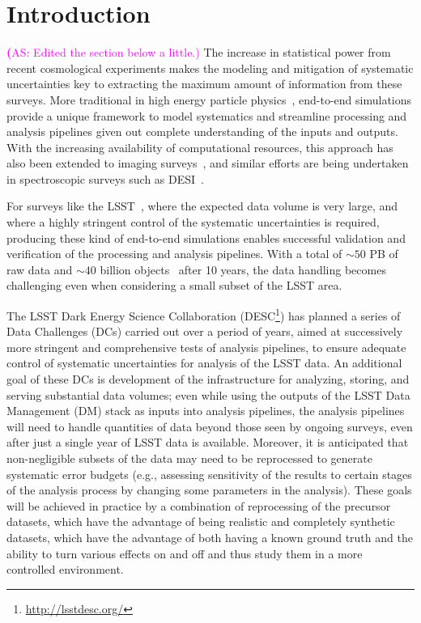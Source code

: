 \documentclass[twocolumn]{aastex62}
\newcommand{\as}[1]{{\textcolor{magenta}{{\textbf (AS: #1)}}}}
\begin{document}

\section{Introduction}
\label{sec:intro}
\as{Edited the section below a little.}
The increase in statistical power from recent cosmological experiments makes the modeling and mitigation of systematic uncertainties key to extracting the maximum amount of information from these surveys. More traditional in high energy particle physics~\citep{Brun:118715, 2006JHEP...05..026S}, end-to-end simulations provide a unique framework to
model systematics and streamline processing and analysis pipelines given out complete understanding of the inputs and outputs. With the increasing availability of computational resources, this approach has also been extended to imaging surveys~\citep{2016ApJ...817...25B}, and similar efforts are being undertaken in spectroscopic surveys such as DESI~\citep{2016arXiv161100036D}.

For surveys like the LSST~\citep{Overview}, where the expected data volume is very large, and where a highly stringent control of the systematic uncertainties is required, producing these
kind of end-to-end simulations enables successful validation and verification of the processing and
analysis pipelines. With a total of $\sim 50$ PB of raw data and $\sim 40$ billion objects~\citep{Overview} after 10 years, the
data handling becomes challenging even when considering a small subset of the LSST area.  

The LSST Dark Energy Science Collaboration
(DESC\footnote{\url{http://lsstdesc.org/}}) has planned a series of
Data Challenges (DCs) carried out over a period of years, aimed at
successively more stringent and comprehensive tests of analysis
pipelines, to ensure adequate control of systematic uncertainties for
analysis of the LSST data.  An additional goal of these DCs is
development of the infrastructure for analyzing, storing, and serving
substantial data volumes; even while using the outputs of the LSST
Data Management (DM) stack as inputs into analysis pipelines, the
analysis pipelines will need to handle quantities of data beyond those
seen by ongoing surveys, even after just a single year of LSST data is
available. Moreover, it is anticipated that non-negligible subsets of
the data may need to be reprocessed to generate systematic error
budgets (e.g., assessing sensitivity of the results to certain stages
of the analysis process by changing some parameters in the
analysis). These goals will be achieved in practice by a combination
of reprocessing of the precursor datasets, which have the advantage of
being realistic and completely synthetic datasets, which have the
advantage of both having a known ground truth and the ability to turn
various effects on and off and thus study them in a more controlled
environment.
\end{document}
